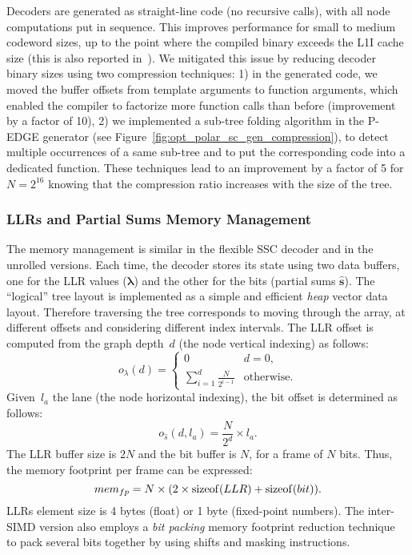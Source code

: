 Decoders are generated as straight-line code (no recursive calls), with all node
computations put in sequence. This improves performance for small to medium
codeword sizes, up to the point where the compiled binary exceeds the L1I cache
size (this is also reported in~\cite{Giard2016b}). We mitigated this issue by
reducing decoder binary sizes using two compression techniques: 1) in the
generated code, we moved the buffer offsets from template arguments to function
arguments, which enabled the compiler to factorize more function calls than
before (improvement by a factor of 10), 2) we implemented a sub-tree folding
algorithm in the P-EDGE generator (see
Figure~\ref{fig:opt_polar_sc_gen_compression}), to detect multiple occurrences
of a same sub-tree and to put the corresponding code into a dedicated function.
These techniques lead to an improvement by a factor of 5 for $N=2^{16}$ knowing
that the compression ratio increases with the size of the tree.

\newpage
\subsubsection{LLRs and Partial Sums Memory Management}

The memory management is similar in the flexible SSC decoder and in the unrolled
versions. Each time, the decoder stores its state using two data buffers, one
for the LLR values ($\bm{\lambda}$) and the other for the bits (partial sums
$\bm{\hat{s}}$). The ``logical'' tree layout is implemented as a simple and
efficient \emph{heap} vector data layout. Therefore traversing the tree
corresponds to moving through the array, at different offsets and considering
different index intervals. The LLR offset is computed from the graph depth~$d$
(the node vertical indexing) as follows:
\begin{equation}
 o_{\lambda}(d) = \begin{cases}
   0                                         &\text{$d = 0$},\\
   \sum\limits_{i = 1}^{d} \frac{N}{2^{i-1}} &\text{otherwise.}
\end{cases}
\end{equation}
Given~$l_a$ the lane (the node horizontal indexing), the bit offset is
determined as follows:
\begin{equation}
  o_{\hat{s}}(d,l_a) = \frac{N}{2^d} \times l_a.
\end{equation}
The LLR buffer size is $2N$ and the bit buffer is $N$, for a frame of $N$ bits.
Thus, the memory footprint per frame can be expressed:
\begin{equation}
  mem_{fp} = N \times (2 \times \operatorname*{sizeof}(LLR) + \operatorname*{sizeof}(bit)).
\end{equation}
LLRs element size is 4 bytes (float) or 1 byte (fixed-point numbers). The
inter-SIMD version also employs a \emph{bit packing} memory footprint reduction
technique~\cite{LeGal2015a} to pack several bits together by using shifts and
masking instructions.

